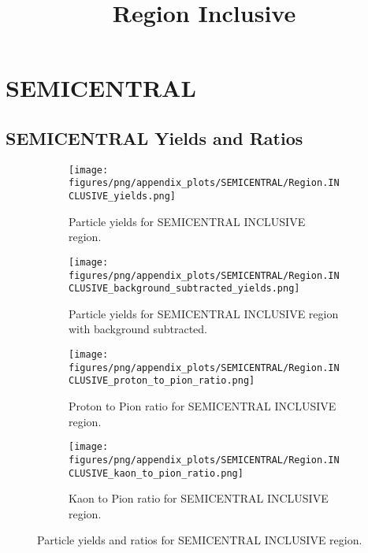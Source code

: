     
        \section{SEMICENTRAL}
        
                \subsection{SEMICENTRAL Yields and Ratios}
                \begin{figure}[H]
                    \title{Region Inclusive}
                    \begin{subfigure}[b]{0.5\textwidth}
                        \centering
                        \texttt{[image: figures/png/appendix\_plots/SEMICENTRAL/Region.INCLUSIVE\_yields.png]}
                        \caption{Particle yields for SEMICENTRAL INCLUSIVE region.}
                        \label{fig:appendix_SEMICENTRAL_INCLUSIVE_Inclusive_Yields}
                    \end{subfigure}
                    \begin{subfigure}[b]{0.5\textwidth}
                        \centering
                        \texttt{[image: figures/png/appendix\_plots/SEMICENTRAL/Region.INCLUSIVE\_background\_subtracted\_yields.png]}
                        \caption{Particle yields for SEMICENTRAL INCLUSIVE region with background subtracted.}
                        \label{fig:appendix_SEMICENTRAL_INCLUSIVE_Inclusive_Yields_Background_Subtracted}
                    \end{subfigure}
                    \begin{subfigure}[b]{0.5\textwidth}
                        \centering
                        \texttt{[image: figures/png/appendix\_plots/SEMICENTRAL/Region.INCLUSIVE\_proton\_to\_pion\_ratio.png]}
                        \caption{Proton to Pion ratio for SEMICENTRAL INCLUSIVE region.}
                        \label{fig:appendix_SEMICENTRAL_INCLUSIVE_Proton_to_Pion_Ratio}
                    \end{subfigure}
                    \begin{subfigure}[b]{0.5\textwidth}
                        \centering
                        \texttt{[image: figures/png/appendix\_plots/SEMICENTRAL/Region.INCLUSIVE\_kaon\_to\_pion\_ratio.png]}
                        \caption{Kaon to Pion ratio for SEMICENTRAL INCLUSIVE region.}
                        \label{fig:appendix_SEMICENTRAL_INCLUSIVE_Kaon_to_Pion_Ratio}
                    \end{subfigure}
                    \caption{Particle yields and ratios for SEMICENTRAL INCLUSIVE region.}
                    \label{fig:appendix_SEMICENTRAL_INCLUSIVE_Inclusive_Yields_and_Ratios}
                \end{figure}
